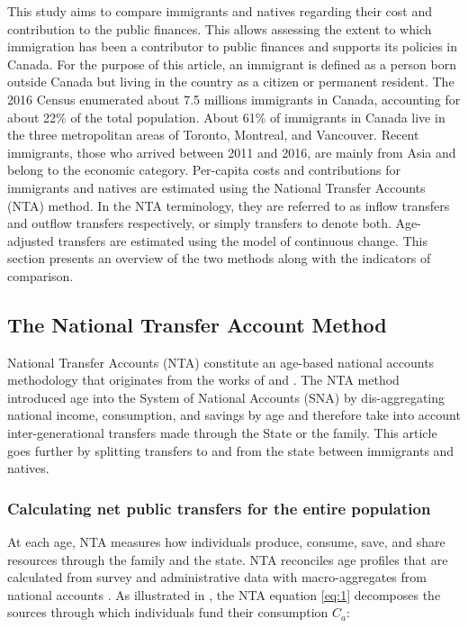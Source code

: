 This study aims to compare immigrants and natives regarding their cost and contribution to the public finances.
This allows assessing the extent to which immigration has been a contributor to public finances and supports its policies in Canada.
For the purpose of this article, an immigrant is defined as a person born outside Canada but living in the country as a citizen or permanent resident.
The 2016 Census enumerated about 7.5 millions immigrants in Canada, accounting for about 22\% of the total population.
About 61\% of immigrants in Canada live in the three metropolitan areas of Toronto, Montreal, and Vancouver.
Recent immigrants, those who arrived between 2011 and 2016, are mainly from Asia and belong to the economic category.
Per-capita costs and contributions for immigrants and natives are estimated using the National Transfer Accounts (NTA) method.
In the NTA terminology, they are referred to as inflow transfers and outflow transfers respectively, or simply transfers to denote both.
Age-adjusted transfers are estimated using the model of continuous change.
This section presents an overview of the two methods along with the indicators of comparison.

\subsection{The National Transfer Account Method}\label{sec:nta}
National Transfer Accounts (NTA) constitute an age-based national accounts methodology that originates from the works of \citet{Lee:1980ci} and \citet{Mason:1988fz}.
The NTA method introduced age into the System of National Accounts (SNA) by dis-aggregating national income, consumption, and savings by age and therefore take into account inter-generational transfers made through the State or the family.
This article goes further by splitting transfers to and from the state between immigrants and natives.

\subsubsection*{Calculating net public transfers for the entire population}
At each age, NTA measures how individuals produce, consume, save, and share resources through the family and the state.
NTA reconciles age profiles that are calculated from survey and administrative data with macro-aggregates from national accounts \citep{UnitedNations:2013vz}.
As illustrated in \citet{dAlbis:2019de}, the NTA equation \eqref{eq:1} decomposes the sources through which individuals fund their consumption \(C_a\):

